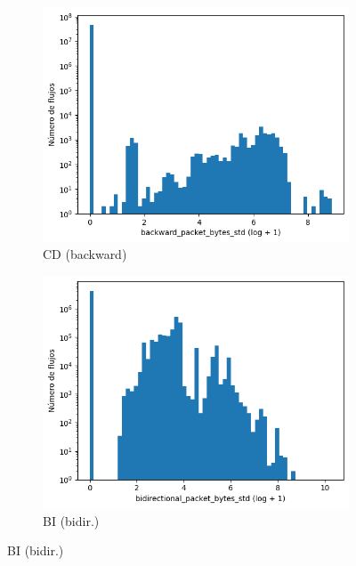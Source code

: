 \begin{figure}[H]
\begin{subfigure}[b]{0.26\textwidth}
        \includegraphics[width=\textwidth]{media/packet_pincer_cicddos/backward_packet_bytes_std_log_x_log_y.png}
        \caption{CD (backward)}
    \end{subfigure}
    \hfill
    \begin{subfigure}[b]{0.26\textwidth}
        \centering
        \includegraphics[width=\linewidth]{media/packet_pincer_botiot/bidirectional_packet_bytes_std_log_x_log_y.png}
        \caption{BI (bidir.)}

\end{subfigure}
\end{figure}
